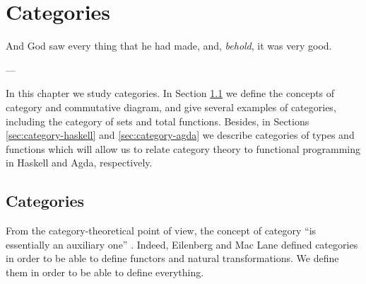 \chapter{Categories}
\label{chap:categories}

\epigraph{
  And God saw every thing that he had made, and, \emph{behold}, it was
  very good.
}{---\textcite[Genesis 1:31]{god-1769}}

In this chapter we study categories. In Section \ref{sec:categories}
we define the concepts of category and commutative diagram, and give
several examples of categories, including the category of sets and
total functions. Besides, in Sections \ref{sec:category-haskell} and
\ref{sec:category-agda} we describe categories of types and functions
which will allow us to relate category theory to functional
programming in Haskell and Agda, respectively.

\section{Categories}
\label{sec:categories}

From the category-theoretical point of view, the concept of category
``is essentially an auxiliary one''
\parencite[247]{eilenberg-maclane-1945}. Indeed, Eilenberg and Mac
Lane defined categories in order to be able to define functors and
natural transformations. We define them in order to be able to define
everything.

